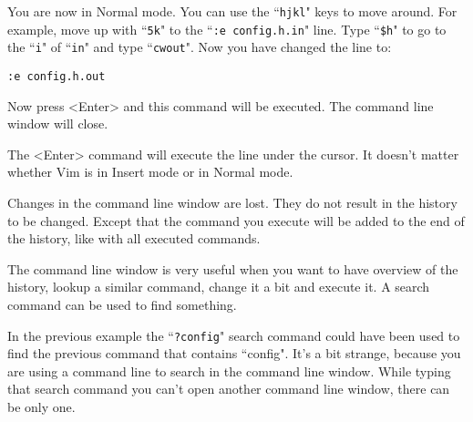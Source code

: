 You are now in Normal mode.
You can use the ``\texttt{hjkl}" keys to move around.
For example, move up with ``\texttt{5k}" to the ``\texttt{:e config.h.in}" line.
Type ``\texttt{\$h}" to go to the ``\texttt{i}" of ``\texttt{in}" and type ``\texttt{cwout}".
Now you have changed the line to:

\begin{Verbatim}[samepage=true]
    :e config.h.out 
\end{Verbatim}

Now press <Enter> and this command will be executed.
The command line window will close.

The <Enter> command will execute the line under the cursor.
It doesn't matter whether Vim is in Insert mode or in Normal mode.

Changes in the command line window are lost.
They do not result in the history to be changed.
Except that the command you execute will be added to the end of the history, like with all executed commands.

The command line window is very useful when you want to have overview of the history, lookup a similar command, change it a bit and execute it.
A search command can be used to find something.

In the previous example the ``\texttt{?config}" search command could have been used to find the previous command that contains ``config".
It's a bit strange, because you are using a command line to search in the command line window.
While typing that search command you can't open another command line window, there can be only one.
\clearpage

